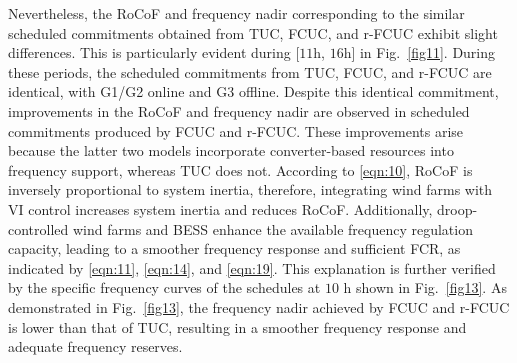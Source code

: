 \documentclass[lettersize,journal]{IEEEtran}
\begin{document}
Nevertheless, the RoCoF and frequency nadir corresponding to the similar scheduled commitments obtained from TUC, FCUC, and r-FCUC exhibit slight differences. This is particularly evident during [$11$h, $16$h] in Fig.~\ref{fig11}. During these periods, the scheduled commitments from TUC, FCUC, and r-FCUC are identical, with G1/G2 online and G3 offline. Despite this identical commitment, improvements in the RoCoF and frequency nadir are observed in scheduled commitments produced by FCUC and r-FCUC. These improvements arise because the latter two models incorporate converter-based resources into frequency support, whereas TUC does not. According to \eqref{eqn:10}, RoCoF is inversely proportional to system inertia, therefore, integrating wind farms with VI control increases system inertia and reduces RoCoF. Additionally, droop-controlled wind farms and BESS enhance the available frequency regulation capacity, leading to a smoother frequency response and sufficient FCR, as indicated by \eqref{eqn:11}, \eqref{eqn:14}, and \eqref{eqn:19}. This explanation is further verified by the specific frequency curves of the schedules at $10$ h shown in Fig.~\ref{fig13}. As demonstrated in Fig.~\ref{fig13}, the frequency nadir achieved by FCUC and r-FCUC is lower than that of TUC, resulting in a smoother frequency response and adequate frequency reserves.



\end{document}
